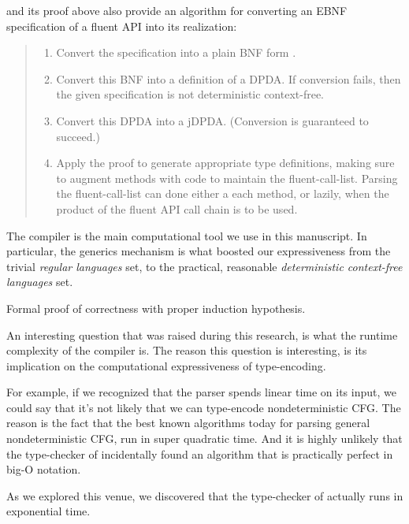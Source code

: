  and its proof above also provide
an algorithm for converting an EBNF specification of a fluent API into
its realization:
\begin{quote}
  \begin{enumerate}
    \item Convert the specification into a plain BNF form
    .
    \item Convert this BNF into a definition of a DPDA. If conversion fails,
      then the given specification is not deterministic context-free.~\cite{C1}
    \item Convert this DPDA into a jDPDA. (Conversion is guaranteed to succeed.)~\cite{CONVERT}
    \item Apply the proof to generate appropriate \Java type definitions, making sure to
        augment methods with code to maintain the fluent-call-list.
        Parsing the fluent-call-list can done either a each method,
        or lazily, when the product of the fluent API call chain is to
         be used.
  \end{enumerate}
\end{quote}

The \Java compiler is the main computational tool we use
in this manuscript.
In particular, the \Java generics mechanism is what
boosted our expressiveness from the trivial \emph{regular languages}
set, to the practical, reasonable \emph{deterministic context-free languages} set.

Formal proof of correctness with proper induction hypothesis.

An interesting question that was raised during this research,
  is what the runtime complexity of the \Java compiler is.
The reason this question is interesting, is its implication
  on the computational expressiveness of type-encoding.

For example, if we recognized that the \Java parser spends
  linear time on its input, we could say that it's not
  likely that we can type-encode nondeterministic CFG\@.
The reason is the fact that the best known algorithms
  today for parsing general nondeterministic CFG,
  run in super quadratic time.
And it is highly unlikely that the type-checker of \Java incidentally
  found an algorithm that is practically perfect in big-O notation.

As we explored this venue, we discovered that the type-checker of
  \Java actually runs in exponential time.

